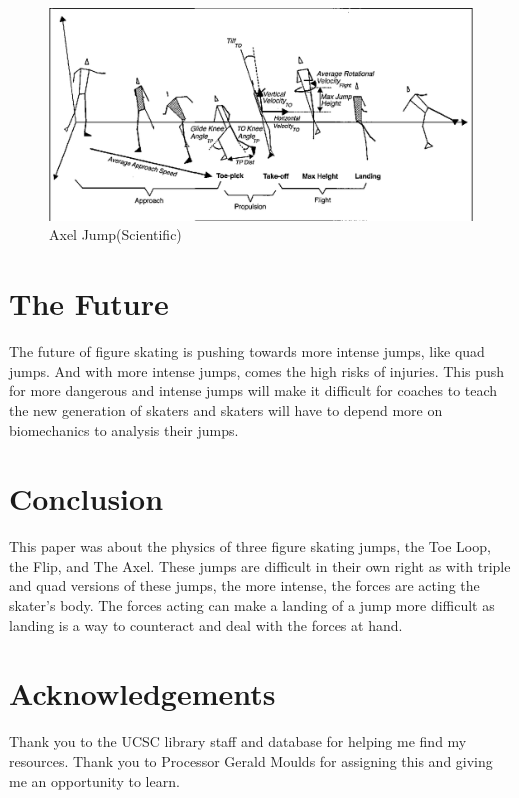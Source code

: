 \documentclass[12pt,journal,compsoc]{IEEEtran}
\begin{document}
\begin{figure}[h]
	\centering
	\includegraphics[width=\linewidth]{Axel_Jump.PNG}
	\caption{Axel Jump(Scientific)}
	\label{Fig:AxelJump}
\end{figure}

\section{The Future}
The future of figure skating is pushing towards more intense jumps, like quad jumps. And with more intense jumps, comes the high risks of injuries. This push for more dangerous and intense jumps will make it difficult for coaches to teach the new generation of skaters and skaters will have to depend more on biomechanics to analysis their jumps. 

\section{Conclusion}
This paper was about the physics of three figure skating jumps, the Toe Loop, the Flip, and The Axel. These jumps are difficult in their own right as with triple and quad versions of these jumps, the more intense, the forces are acting the skater's body. The forces acting can make a landing of a jump more difficult as landing is a way to counteract and deal with the forces at hand. 

\section*{Acknowledgements}
Thank you to the UCSC library staff and database for helping me find my resources. Thank you to Processor Gerald Moulds for assigning this and giving me an opportunity to learn. 
\end{document}
